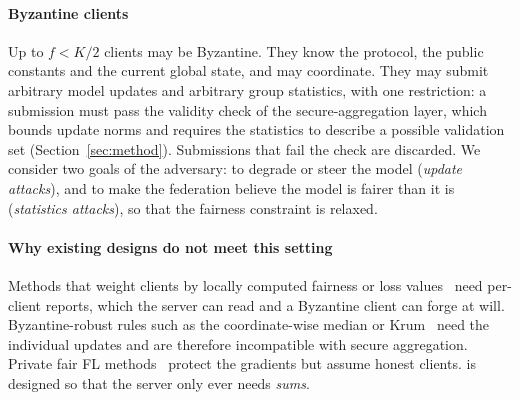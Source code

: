 \paragraph{Byzantine clients}
Up to $f<K/2$ clients may be Byzantine. They know the protocol, the public constants and the current global state, and may coordinate. They may submit arbitrary model updates and arbitrary group statistics, with one restriction: a submission must pass the validity check of the secure-aggregation layer, which bounds update norms and requires the statistics to describe a possible validation set (Section~\ref{sec:method}). Submissions that fail the check are discarded. We consider two goals of the adversary: to degrade or steer the model (\emph{update attacks}), and to make the federation believe the model is fairer than it is (\emph{statistics attacks}), so that the fairness constraint is relaxed.

\paragraph{Why existing designs do not meet this setting}
Methods that weight clients by locally computed fairness or loss values~\citep{ezzeldin2023fairfed,li2020fair} need per-client reports, which the server can read and a Byzantine client can forge at will. Byzantine-robust rules such as the coordinate-wise median or Krum~\citep{yin2018byzantine,blanchard2017krum} need the individual updates and are therefore incompatible with secure aggregation. Private fair FL methods~\citep{corbucci2024puffle,ling2024feddp} protect the gradients but assume honest clients. \clamp{} is designed so that the server only ever needs \emph{sums}.
